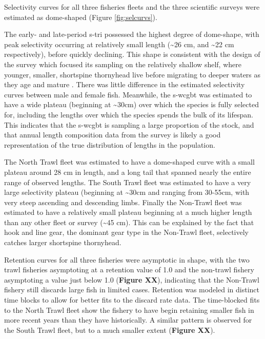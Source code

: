\documentclass[11pt,
  english,
  letterpaper,
]{article}
\begin{document}
Selectivity curves for all three fisheries fleets and the three scientific surveys were estimated as dome-shaped (Figure \ref{fig:selcurvs}).

The early- and late-period \gls{s-tri} possessed the highest degree of dome-shape, with peak selectivity occurring at relatively small length (\textasciitilde26 cm, and \textasciitilde22 cm respectively), before quickly declining. This shape is consistent with the design of the survey which focused its sampling on the relatively shallow shelf, where younger, smaller, shortspine thornyhead live before migrating to deeper waters as they age and mature . There was little difference in the estimated selectivity curves between male and female fish. Meanwhile, the \gls{s-wcgbt} was estimated to have a wide plateau (beginning at \textasciitilde30cm) over which the species is fully selected for, including the lengths over which the species spends the bulk of its lifespan. This indicates that the \gls{s-wcgbt} is sampling a large proportion of the stock, and that annual length composition data from the survey is likely a good representation of the true distribution of lengths in the population.

The North Trawl fleet was estimated to have a dome-shaped curve with a small plateau around 28 cm in length, and a long tail that spanned nearly the entire range of observed lengths. The South Trawl fleet was estimated to have a very large selectivity plateau (beginning at \textasciitilde30cm and ranging from 30-55cm, with very steep ascending and descending limbs. Finally the Non-Trawl fleet was estimated to have a relatively small plateau beginning at a much higher length than any other fleet or survey (\textasciitilde45 cm). This can be explained by the fact that hook and line gear, the dominant gear type in the Non-Trawl fleet, selectively catches larger shortspine thornyhead.

Retention curves for all three fisheries were asymptotic in shape, with the two trawl fisheries asymptoting at a retention value of 1.0 and the non-trawl fishery asymptoting a value just below 1.0 (\textbf{Figure XX}), indicating that the Non-Trawl fishery still discards large fish in limited cases. Retention was modeled in distinct time blocks to allow for better fits to the discard rate data. The time-blocked fits to the North Trawl fleet show the fishery to have begin retaining smaller fish in more recent years than they have historically. A similar pattern is observed for the South Trawl fleet, but to a much smaller extent (\textbf{Figure XX}).
\end{document}
